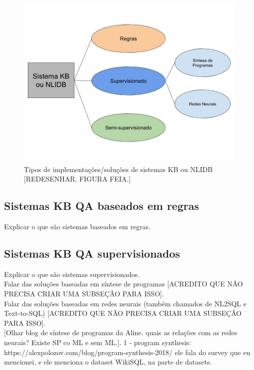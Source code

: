 \documentclass{article}
\begin{document}
\begin{figure}[h!]
\centering
\includegraphics[scale=0.2]{SistemaKBNLIDB.jpg}
\caption{Tipos de implementações/soluções de sistemas KB ou NLIDB [REDESENHAR. FIGURA FEIA.]}
\label{fig:SistemaKBNLIDB}
\end{figure}

\subsection{Sistemas KB QA baseados em regras}

Explicar o que são sistemas baseados em regras.

\subsection{Sistemas KB QA supervisionados}

Explicar o que são sistemas supervisionados.\\

Falar das soluções baseadas em síntese de programas [ACREDITO QUE NÃO PRECISA CRIAR UMA SUBSEÇÃO PARA ISSO].\\

Falar das soluções baseadas em redes neurais (também chamados de NL2SQL e Text-to-SQL) [ACREDITO QUE NÃO PRECISA CRIAR UMA SUBSEÇÃO PARA ISSO].\\

[Olhar blog de síntese de programas da Aline. quais as relações com as redes neurais? Existe SP co ML e sem ML.]. 1 - program synthesis: https://alexpolozov.com/blog/program-synthesis-2018/ ele fala do survey que eu mencionei, e ele menciona o dataset WikiSQL, na parte de datasets.
\end{document}
